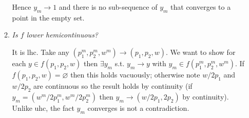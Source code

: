 \documentclass{article}
\begin{document}
\begin{enumerate}[1.]
\begin{enumerate}
        Hence $y_m \to 1$ and there is no sub-sequence of $y_m$ that converges to a point in the empty set. 


      \item \textit{Is $f$ lower hemicontinuous?}

        \solution It is lhc. Take any $(p_1^m, p_2^m, w^m) \to (p_1, p_2, w)$. We want to show for each $y \in f(p_1, p_2, w)$ then $\exists y_m$ s.t. $y_m \to y$ with $y_m \in f(p_1^m, p_2^m, w^m)$. If $f(p_1, p_2, w) = \varnothing$ then this holds vacuously; otherwise note $w/2p_1$ and $w/2p_2$ are continuous so the result holds by continuity (if $y_m = (w^m/2p_1^m, w^m/2p^m_2)$ then $y_m \to (w/2p_1, 2p_2)$ by continuity). Unlike uhc, the fact $y_m$ converges is not a contradiction.


\end{enumerate}
\end{enumerate}
\end{document}
